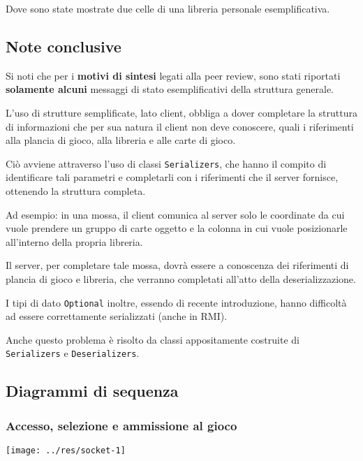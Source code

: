 \documentclass[a4paper,11pt]{article} %
\begin{document}
    Dove sono state mostrate due celle di una libreria personale esemplificativa.

    \subsection{Note conclusive}\label{subsec:note-conclusive}
    Si noti che per i \textbf{motivi di sintesi} legati alla peer review, sono stati riportati \textbf{solamente alcuni} messaggi di stato esemplificativi della struttura generale.

    L'uso di strutture semplificate, lato client, obbliga a dover completare la struttura di informazioni che per sua natura il client non deve conoscere,
    quali i riferimenti alla plancia di gioco, alla libreria e alle carte di gioco.

    Ciò avviene attraverso l'uso di classi \texttt{Serializers}, che hanno il compito di identificare tali parametri e completarli con i riferimenti
    che il server fornisce, ottenendo la struttura completa.

    Ad esempio: in una mossa, il client comunica al server solo le coordinate da cui vuole prendere un gruppo di carte oggetto e la colonna in cui vuole posizionarle
    all'interno della propria libreria.

    Il server, per completare tale mossa, dovrà essere a conoscenza dei riferimenti di plancia di gioco e libreria, che verranno completati all'atto della
    deserializzazione.

    \smallskip

    I tipi di dato \texttt{Optional} inoltre, essendo di recente introduzione, hanno difficoltà ad essere correttamente serializzati (anche in RMI).

    Anche questo problema è risolto da classi appositamente costruite di \texttt{Serializers} e \texttt{Deserializers}.

    \newpage

    \subsection{Diagrammi di sequenza}\label{subsec:diagrammi-di-sequenza}

    \subsubsection{Accesso, selezione e ammissione al gioco}

    \texttt{[image: ../res/socket-1]}
\end{document}
